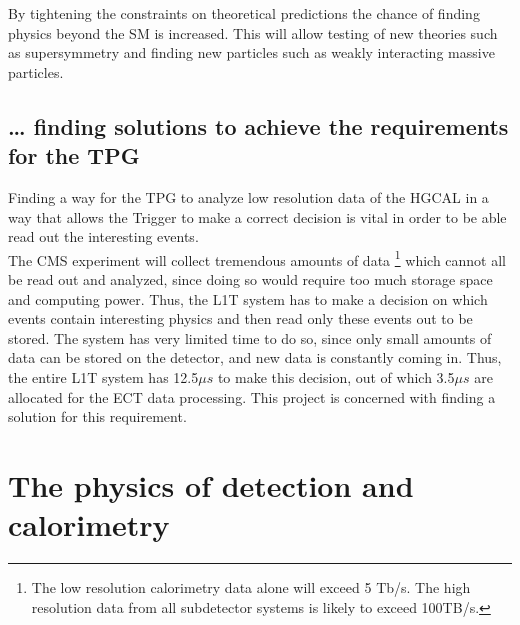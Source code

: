 \documentclass[12 pt]{article}
\begin{document}
			By tightening the constraints on theoretical predictions the chance of finding physics beyond the SM is increased. This will allow testing of new theories such as supersymmetry and finding new particles such as weakly interacting massive particles. 

		\subsection{… finding solutions to achieve the requirements for the TPG}
			Finding a way for the TPG to analyze low resolution data of the HGCAL in a way that allows the Trigger to make a correct decision is vital in order to be able read out the interesting events. \\

			The CMS experiment will collect tremendous amounts of data \footnote{The low resolution calorimetry data alone will exceed 5 Tb/s. The high resolution data from all subdetector systems is likely to exceed 100TB/s.} which cannot all be read out and analyzed, since doing so would require too much storage space and computing power. Thus, the L1T system has to make a decision on which events contain interesting physics and then read only these events out to be stored. The system has very limited time to do so, since only small amounts of data can be stored on the detector, and new data is constantly coming in. Thus, the entire L1T system has 12.5$\mu s$ to make this decision, out of which 3.5$\mu s$ are allocated for the ECT data processing. This project is concerned with finding a solution for this requirement. 

		
	\section{The physics of detection and calorimetry}
\end{document}
